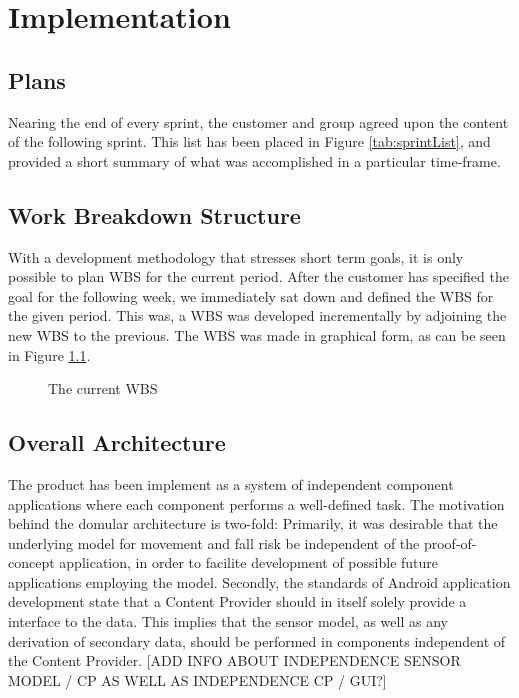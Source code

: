 \chapter{Implementation}
\section{Plans}

Nearing the end of every sprint, the customer and group agreed upon the content of the following sprint. This list has been placed in Figure \ref{tab:sprintList}, and provided a short summary of what was accomplished in a particular time-frame. 

\section{Work Breakdown Structure}
With a development methodology that stresses short term goals, it is only possible to plan WBS for the current period. After the customer has specified the goal for the following week, we immediately sat down and defined the WBS for the given period. This was, a WBS was developed incrementally by adjoining the new WBS to the previous. The WBS was made in graphical form, as can be seen in Figure \ref{fig:WBS}.

\begin{figure}[p]

\setlength\fboxsep{0pt}
\setlength\fboxrule{1pt}\noindent{}
\label{fig:WBS}
\caption{The current WBS}
\end{figure}

\section{Overall Architecture}
The product has been implement as a system of independent component applications where each component performs a well-defined task. The motivation behind the domular architecture is two-fold: Primarily, it was desirable that the underlying model for movement and fall risk be independent of the proof-of-concept application, in order to facilite development of possible future applications employing the model. Secondly, the standards of Android application development state that a Content Provider should in itself solely provide a interface to the data. This implies that the sensor model, as well as any derivation of secondary data, should be performed in components independent of the Content Provider. [ADD INFO ABOUT INDEPENDENCE SENSOR MODEL / CP AS WELL AS INDEPENDENCE CP / GUI?]

